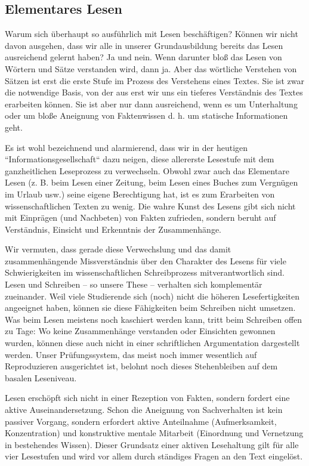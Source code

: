 \documentclass[]{book}
\theoremstyle{definition}
\theoremstyle{definition}
\theoremstyle{definition}
\theoremstyle{remark}
\begin{document}
\subsection{Elementares Lesen}\label{elementares-lesen}

Warum sich überhaupt so ausführlich mit Lesen beschäftigen? Können wir
nicht davon ausgehen, dass wir alle in unserer Grundausbildung bereits
das Lesen ausreichend gelernt haben? Ja und nein. Wenn darunter bloß das
Lesen von Wörtern und Sätze verstanden wird, dann ja. Aber das wörtliche
Verstehen von Sätzen ist erst die erste Stufe im Prozess des Verstehens
eines Textes. Sie ist zwar die notwendige Basis, von der aus erst wir
uns ein tieferes Verständnis des Textes erarbeiten können. Sie ist aber
nur dann ausreichend, wenn es um Unterhaltung oder um bloße Aneignung
von Faktenwissen d. h. um statische Informationen geht.

Es ist wohl bezeichnend und alarmierend, dass wir in der heutigen
``Informationsgesellschaft`` dazu neigen, diese allererste Lesestufe mit
dem ganzheitlichen Leseprozess zu verwechseln. Obwohl zwar auch das
Elementare Lesen (z. B. beim Lesen einer Zeitung, beim Lesen eines
Buches zum Vergnügen im Urlaub usw.) seine eigene Berechtigung hat, ist
es zum Erarbeiten von wissenschaftlichen Texten zu wenig. Die wahre
Kunst des Lesens gibt sich nicht mit Einprägen (und Nachbeten) von
Fakten zufrieden, sondern beruht auf Verständnis, Einsicht und
Erkenntnis der Zusammenhänge.

Wir vermuten, dass gerade diese Verwechslung und das damit
zusammenhängende Missverständnis über den Charakter des Lesens für viele
Schwierigkeiten im wissenschaftlichen Schreibprozess mitverantwortlich
sind. Lesen und Schreiben -- so unsere These -- verhalten sich
komplementär zueinander. Weil viele Studierende sich (noch) nicht die
höheren Lesefertigkeiten angeeignet haben, können sie diese Fähigkeiten
beim Schreiben nicht umsetzen. Was beim Lesen meistens noch kaschiert
werden kann, tritt beim Schreiben offen zu Tage: Wo keine Zusammenhänge
verstanden oder Einsichten gewonnen wurden, können diese auch nicht in
einer schriftlichen Argumentation dargestellt werden. Unser
Prüfungssystem, das meist noch immer wesentlich auf Reproduzieren
ausgerichtet ist, belohnt noch dieses Stehenbleiben auf dem basalen
Leseniveau.

Lesen erschöpft sich nicht in einer Rezeption von Fakten, sondern
fordert eine aktive Auseinandersetzung. Schon die Aneignung von
Sachverhalten ist kein passiver Vorgang, sondern erfordert aktive
Anteilnahme (Aufmerksamkeit, Konzentration) und konstruktive mentale
Mitarbeit (Einordnung und Vernetzung in bestehendes Wissen). Dieser
Grundsatz einer aktiven Lesehaltung gilt für alle vier Lesestufen und
wird vor allem durch ständiges Fragen an den Text eingelöst.
\end{document}
